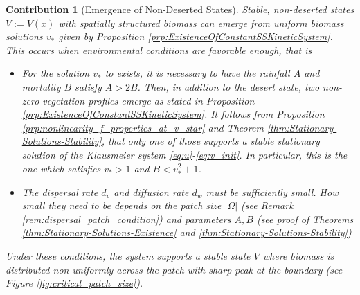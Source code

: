 \documentclass[11pt, a4paper]{article}
\theoremstyle{break}
\theoremstyle{break}
\theoremstyle{break}
\theoremstyle{break}
\theoremstyle{break}
\theoremstyle{break}
\theoremstyle{break}
\theoremstyle{break}
\theoremstyle{break}
\newtheorem{main_contrib}{Contribution}
\begin{document}
\begin{main_contrib}[Emergence of Non-Deserted States]
Stable, non-deserted states $V:=V(x)$ with spatially structured biomass can emerge from uniform biomass solutions $v_*$ given by Proposition \ref{prp:ExistenceOfConstantSSKineticSystem}. This occurs when environmental conditions are favorable enough, that is
\begin{itemize}
    \item For the solution $v_*$ to exists, it is necessary to have the rainfall $A$ and mortality $B$ satisfy $A > 2B$. Then, in addition to the desert state, two non-zero vegetation profiles emerge as stated in Proposition \ref{prp:ExistenceOfConstantSSKineticSystem}. It follows from Proposition \ref{prp:nonlinearity_f_properties_at_v_star} and Theorem \ref{thm:Stationary-Solutions-Stability}, that only one of those supports a stable stationary solution of the Klausmeier system \eqref{eq:u}-\eqref{eq:v_init}. In particular, this is the one which satisfies $v_* > 1$ and $B < v_*^2 + 1$.
    \item The dispersal rate $d_v$ and diffusion rate $d_w$ must be sufficiently small. How small they need to be depends on the patch size $|\Omega|$ (see Remark \ref{rem:dispersal_patch_condition}) and parameters $A, B$ (see proof of Theorems \ref{thm:Stationary-Solutions-Existence} and \ref{thm:Stationary-Solutions-Stability})
\end{itemize}
Under these conditions, the system supports a stable state $V$ where biomass is distributed non-uniformly across the patch with sharp peak at the boundary (see Figure \ref{fig:critical_patch_size}).
\end{main_contrib}


\end{document}
